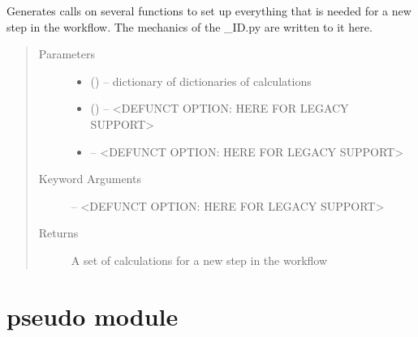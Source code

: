 \documentclass[letterpaper,10pt,english]{sphinxmanual}
\begin{document}

\begin{fulllineitems}
\label{\detokenize{prep:prep.writeToScript}}
Generates calls on several functions to set up everything that is needed for a new step in the workflow.
The mechanics of the \_ID.py are written to it here.
\begin{quote}\begin{description}
\item[{Parameters}] \leavevmode\begin{itemize}
\item {} 
 () -- dictionary of dictionaries of calculations

\item {} 
 () -- \textless{}DEFUNCT OPTION: HERE FOR LEGACY SUPPORT\textgreater{}

\item {} 
 -- \textless{}DEFUNCT OPTION: HERE FOR LEGACY SUPPORT\textgreater{}

\end{itemize}

\item[{Keyword Arguments}] \leavevmode
{} -- \textless{}DEFUNCT OPTION: HERE FOR LEGACY SUPPORT\textgreater{}

\item[{Returns}] \leavevmode
A set of calculations for a new step in the workflow

\end{description}\end{quote}

\end{fulllineitems}



\chapter{pseudo module}
\label{\detokenize{pseudo::doc}}\label{\detokenize{pseudo:pseudo-module}}\label{\detokenize{pseudo:module-pseudo}}

\begin{fulllineitems}
\label{\detokenize{pseudo:pseudo.brute_test}}
\end{fulllineitems}
\end{document}
